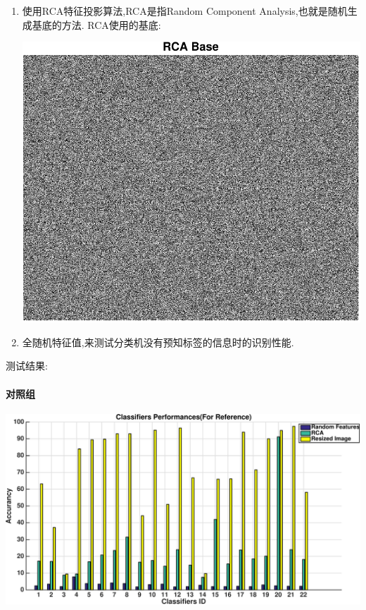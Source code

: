 \begin{enumerate}
	\item 使用RCA特征投影算法,RCA是指Random Component Analysis,也就是随机生成基底的方法. RCA使用的基底: 
			\begin{center}
	\begin{minipage}[t]{\linewidth}
	\center
	{
	\includegraphics[width=\MyFactor\textwidth]{Img/rca_base} 
	}
	\end{minipage}
	\medskip
	\end{center}
	\item 全随机特征值,来测试分类机没有预知标签的信息时的识别性能.

\end{enumerate}

测试结果:

\paragraph{对照组}

	\begin{center}
	\begin{minipage}[t]{\linewidth}
	\center
	{
	\includegraphics[width=\textwidth]{Img/pni_res_ref.pdf} 
	}
	\end{minipage}
	\medskip
	\end{center}


